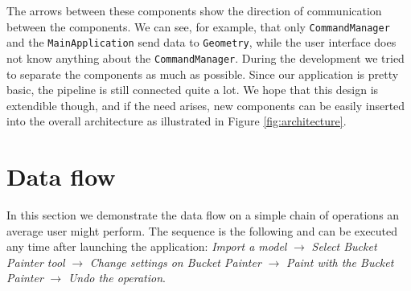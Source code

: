 The arrows between these components show the direction of communication between the components. We can see, for example, that only \texttt{CommandManager} and the \texttt{MainApplication} send data to \texttt{Geometry}, while the user interface does not know anything about the \texttt{CommandManager}. During the development we tried to separate the components as much as possible. Since our application is pretty basic, the pipeline is still connected quite a lot. We hope that this design is extendible though, and if the need arises, new components can be easily inserted into the overall architecture as illustrated in Figure \ref{fig:architecture}.

\section{Data flow}

In this section we demonstrate the data flow on a simple chain of operations an average user might perform. The sequence is the following and can be executed any time after launching the application: \textit{Import a model} $\rightarrow$ \textit{Select Bucket Painter tool} $\rightarrow$ \textit{Change settings on Bucket Painter} $\rightarrow$ \textit{Paint with the Bucket Painter} $\rightarrow$ \textit{Undo the operation}.

